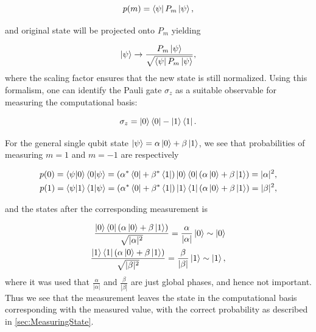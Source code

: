\begin{equation}
    p(m) = \bra{\psi}P_m\ket{\psi},
\end{equation}

and original state will be projected onto $P_m$ yielding 

\begin{equation}
    \ket{\psi} \rightarrow \frac{P_m\ket{\psi}}{\sqrt{\bra{\psi}P_m\ket{\psi}}},
\end{equation}
where the scaling factor ensures that the new state is still normalized. Using this formalism, one can identify the Pauli gate $\sigma_z$ as a suitable observable for measuring the computational basis:

\begin{equation}
    \sigma_z = \ket{0}\bra{0} - \ket{1}\bra{1}.
\end{equation}

For the general single qubit state $\ket{\psi} = \alpha \ket{0} + \beta \ket{1}$, we see that probabilities of measuring $m=1$ and $m=-1$ are respectively

\begin{equation}
\begin{aligned}
    p(0) = \bra{\psi} \ket{0}\bra{0} \ket{\psi} = (\alpha^* \bra{0} + \beta^* \bra{1}) \ket{0}\bra{0} (\alpha \ket{0} + \beta \ket{1}) = |\alpha|^2,\\
    p(1) = \bra{\psi} \ket{1}\bra{1} \ket{\psi} = (\alpha^* \bra{0} + \beta^* \bra{1}) \ket{1}\bra{1} (\alpha \ket{0} + \beta \ket{1}) = |\beta|^2,
\end{aligned}
\end{equation}

and the states after the corresponding measurement is 


\begin{equation}\label{eq:CompBasisMeasurement}
\begin{aligned}
    \frac{\ket{0}\bra{0}(\alpha \ket{0} + \beta \ket{1})}{\sqrt{|\alpha|^2}} = 
    \frac{\alpha}{|\alpha|} \ket{0} \sim \ket{0} \\
    \frac{\ket{1}\bra{1}(\alpha \ket{0} + \beta \ket{1})}{\sqrt{|\beta|^2}} = 
    \frac{\beta}{|\beta|} \ket{1} \sim \ket{1},
\end{aligned}
\end{equation}
where it was used that $\frac{\alpha}{|\alpha|}$ and $\frac{\beta}{|\beta|}$ are just global phases, and hence not important. Thus we see that the measurement leaves the state in the computational basis corresponding with the measured value, with the correct probability as described in \cref{sec:MeasuringState}.

